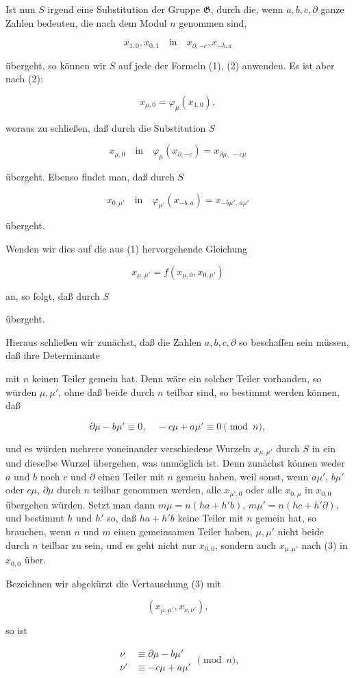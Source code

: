 Ist nun $S$ irgend eine Substitution der Gruppe $\mathfrak{G}$, durch die, wenn $a, b, c, \partial$ ganze Zahlen bedeuten, die nach dem Modul $n$ genommen sind,

\[
x_{1,0}, x_{0,1} \quad \text{in} \quad x_{\partial,-c}, x_{-b,a}
\]

übergeht, so können wir $S$ auf jede der Formeln (1), (2) anwenden. Es ist aber nach (2):

\[
x_{\mu,0} = \varphi_\mu(x_{1,0}),
\]

woraus zu schließen, daß durch die Substitution $S$

\[
x_{\mu,0} \quad \text{in} \quad \varphi_\mu(x_{\partial,-c}) = x_{\partial\mu,\,-c\mu}
\]

übergeht. Ebenso findet man, daß durch $S$

\[
x_{0,\mu'} \quad \text{in} \quad \varphi_{\mu'}(x_{-b,a}) = x_{-b\mu',\,a\mu'}
\]

übergeht.

Wenden wir dies auf die aus (1) hervorgehende Gleichung

\[
x_{\mu,\mu'} = f(x_{\mu,0}, x_{0,\mu'})
\]

an, so folgt, daß durch $S$


übergeht.

Hieraus schließen wir zunächst, daß die Zahlen $a, b, c, \partial$ so beschaffen sein müssen, daß ihre Determinante


mit $n$ keinen Teiler gemein hat. Denn wäre ein solcher Teiler vorhanden, so würden $\mu, \mu'$, ohne daß beide durch $n$ teilbar sind, so bestimmt werden können, daß

\[
\partial\mu - b\mu' \equiv 0, \quad -c\mu + a\mu' \equiv 0 \pmod{n},
\]

und es würden mehrere voneinander verschiedene Wurzeln $x_{\mu,\mu'}$ durch $S$ in ein und dieselbe Wurzel übergehen, was unmöglich ist. Denn zunächst können weder $a$ und $b$ noch $c$ und $\partial$ einen Teiler mit $n$ gemein haben, weil sonst, wenn $a\mu'$, $b\mu'$ oder $c\mu$, $\partial\mu$ durch $n$ teilbar genommen werden, alle $x_{\mu',0}$ oder alle $x_{0,\mu}$ in $x_{0,0}$ übergehen würden. Setzt man dann $m\mu = n(ha + h'b)$, $m\mu' = n(hc + h'\partial)$, und bestimmt $h$ und $h'$ so, daß $ha + h'b$ keine Teiler mit $n$ gemein hat, so brauchen, wenn $n$ und $m$ einen gemeinsamen Teiler haben, $\mu, \mu'$ nicht beide durch $n$ teilbar zu sein, und es geht nicht nur $x_{0,0}$, sondern auch $x_{\mu,\mu'}$ nach (3) in $x_{0,0}$ über.

Bezeichnen wir abgekürzt die Vertauschung (3) mit

\[
(x_{\mu,\mu'}, x_{\nu,\nu'}),
\]

so ist

\[
\begin{aligned}
\nu &\equiv \partial\mu - b\mu' \\
\nu' &\equiv -c\mu + a\mu'
\end{aligned}
\pmod{n},
\]
